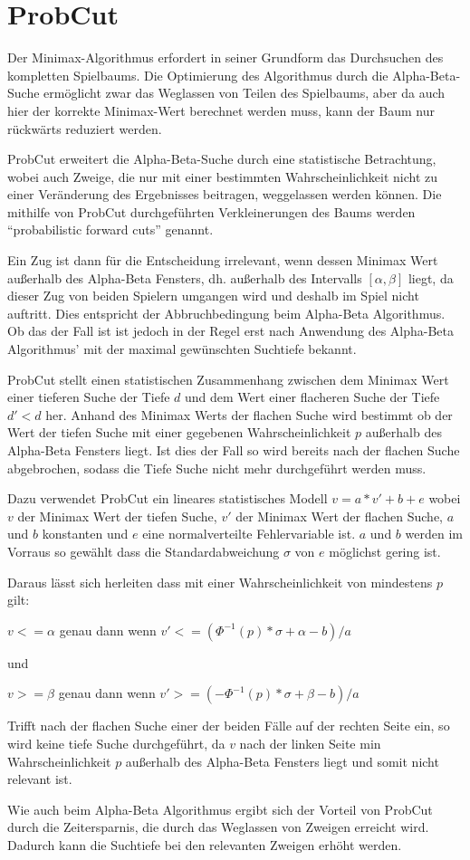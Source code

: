 \section{ProbCut}

Der Minimax-Algorithmus erfordert in seiner Grundform das Durchsuchen des kompletten Spielbaums.
Die Optimierung des Algorithmus durch die Alpha-Beta-Suche ermöglicht zwar das Weglassen von Teilen des Spielbaums, aber da auch hier der korrekte Minimax-Wert berechnet werden muss, kann der Baum nur rückwärts reduziert werden.

ProbCut erweitert die Alpha-Beta-Suche durch eine statistische Betrachtung, wobei auch Zweige, die nur mit einer bestimmten Wahrscheinlichkeit nicht zu einer Veränderung des Ergebnisses beitragen, weggelassen werden können.
Die mithilfe von ProbCut durchgeführten Verkleinerungen des Baums werden "`probabilistic forward cuts"' genannt.

Ein Zug ist dann für die Entscheidung irrelevant, wenn dessen Minimax Wert außerhalb des Alpha-Beta Fensters, dh. außerhalb des Intervalls \([\alpha,\beta]\) liegt, da dieser Zug von beiden Spielern umgangen wird und deshalb im Spiel nicht auftritt.
Dies entspricht der Abbruchbedingung beim Alpha-Beta Algorithmus.
Ob das der Fall ist ist jedoch in der Regel erst nach Anwendung des Alpha-Beta Algorithmus' mit der maximal gewünschten Suchtiefe bekannt.

ProbCut stellt einen statistischen Zusammenhang zwischen dem Minimax Wert einer tieferen Suche der Tiefe \(d\) und dem Wert einer flacheren Suche der Tiefe \(d'<d\) her.
Anhand des Minimax Werts der flachen Suche wird bestimmt ob der Wert der tiefen Suche mit einer gegebenen Wahrscheinlichkeit \(p\) außerhalb des Alpha-Beta Fensters liegt.
Ist dies der Fall so wird bereits nach der flachen Suche abgebrochen, sodass die Tiefe Suche nicht mehr durchgeführt werden muss.

Dazu verwendet ProbCut ein lineares statistisches Modell \(v=a*v'+b+e\) wobei \(v\) der Minimax Wert der tiefen Suche, \(v'\) der Minimax Wert der flachen Suche, \(a\) und \(b\) konstanten und \(e\) eine normalverteilte Fehlervariable ist.
\(a\) und \(b\) werden im Vorraus so gewählt dass die Standardabweichung \(\sigma\) von \(e\) möglichst gering ist.

Daraus lässt sich herleiten dass mit einer Wahrscheinlichkeit von mindestens \(p\) gilt:

\(v<=\alpha\) genau dann wenn \(v'<=(\Phi^{-1}(p)*\sigma+\alpha-b)/a\)

und

\(v>=\beta\) genau dann wenn \(v'>=(-\Phi^{-1}(p)*\sigma+\beta-b)/a\)

Trifft nach der flachen Suche einer der beiden Fälle auf der rechten Seite ein, so wird keine tiefe Suche durchgeführt, da \(v\) nach der linken Seite min Wahrscheinlichkeit \(p\) außerhalb des Alpha-Beta Fensters liegt
und somit nicht relevant ist.

Wie auch beim Alpha-Beta Algorithmus ergibt sich der Vorteil von ProbCut durch die Zeitersparnis, die durch das Weglassen von Zweigen erreicht wird. Dadurch kann die Suchtiefe bei den relevanten Zweigen erhöht werden.
\cite[S.~1]{probcut}
